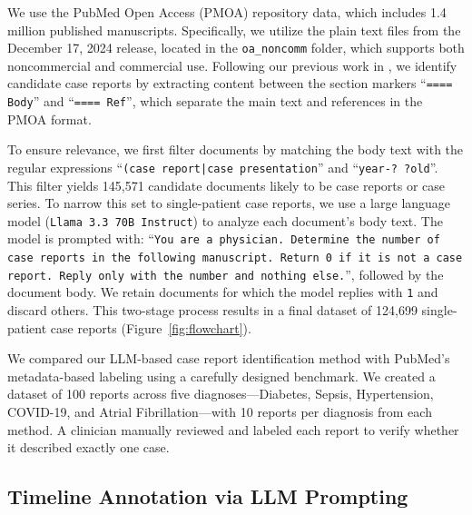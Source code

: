 \documentclass[pdflatex,sn-mathphys-num]{sn-jnl}%
\theoremstyle{thmstyleone}%
\theoremstyle{thmstyletwo}%
\theoremstyle{thmstylethree}%
\begin{document}
We use the PubMed Open Access (PMOA) repository data, which includes 1.4 million published manuscripts. Specifically, we utilize the plain text files from the December 17, 2024 release, located in the \texttt{oa\_noncomm} folder, which supports both noncommercial and commercial use. Following our previous work in \cite{wang2025large}, we identify candidate case reports by extracting content between the section markers ``\texttt{==== Body}'' and ``\texttt{==== Ref}'', which separate the main text and references in the PMOA format.

To ensure relevance, we first filter documents by matching the body text with the regular expressions ``\texttt{(case report|case presentation}'' and ``\texttt{year-? ?old}''.
This filter yields 145,571 candidate documents likely to be case reports or case series. To narrow this set to single-patient case reports, we use a large language model (\texttt{Llama 3.3 70B Instruct}) to analyze each document's body text. The model is prompted with: ``\texttt{You are a physician. Determine the number of case reports in the following manuscript. Return 0 if it is not a case report. Reply only with the number and nothing else.}'', followed by the document body. We retain documents for which the model replies with \texttt{1} and discard others. This two-stage process results in a final dataset of 124,699 single-patient case reports (Figure~\ref{fig:flowchart}).

We compared our LLM-based case report identification method with PubMed's metadata-based labeling using a carefully designed benchmark. We created a dataset of 100 reports across five diagnoses—Diabetes, Sepsis, Hypertension, COVID-19, and Atrial Fibrillation—with 10 reports per diagnosis from each method. A clinician manually reviewed and labeled each report to verify whether it described exactly one case. 


\subsection{Timeline Annotation via LLM Prompting}
\label{sec:timeline-annotation}
\end{document}
